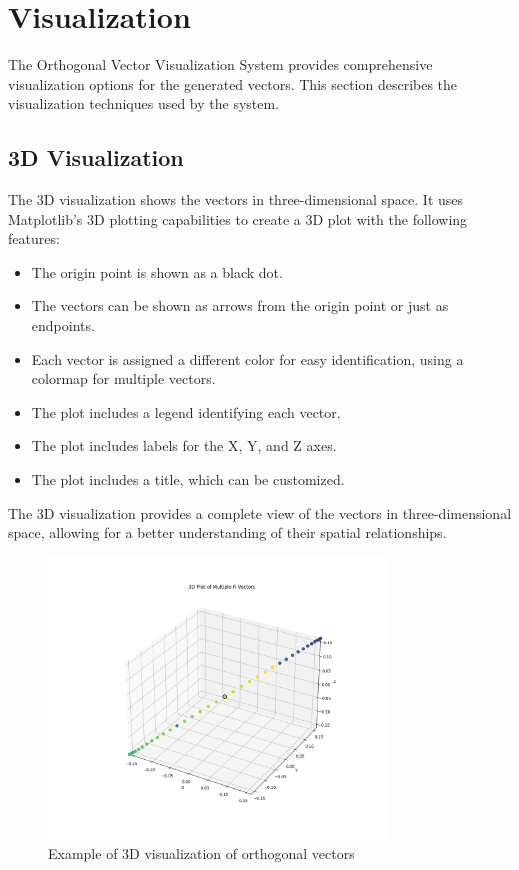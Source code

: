 \newpage
\section{Visualization}

The Orthogonal Vector Visualization System provides comprehensive visualization options for the generated vectors. This section describes the visualization techniques used by the system.

\subsection{3D Visualization}

The 3D visualization shows the vectors in three-dimensional space. It uses Matplotlib's 3D plotting capabilities to create a 3D plot with the following features:

\begin{itemize}
    \item The origin point is shown as a black dot.
    \item The vectors can be shown as arrows from the origin point or just as endpoints.
    \item Each vector is assigned a different color for easy identification, using a colormap for multiple vectors.
    \item The plot includes a legend identifying each vector.
    \item The plot includes labels for the X, Y, and Z axes.
    \item The plot includes a title, which can be customized.
\end{itemize}

The 3D visualization provides a complete view of the vectors in three-dimensional space, allowing for a better understanding of their spatial relationships.

\begin{figure}[H]
    \centering
    \includegraphics[width=0.8\textwidth]{figures/orthogonal_3d.png}
    \caption{Example of 3D visualization of orthogonal vectors}
    \label{fig:vis_3d_plot}
\end{figure}

